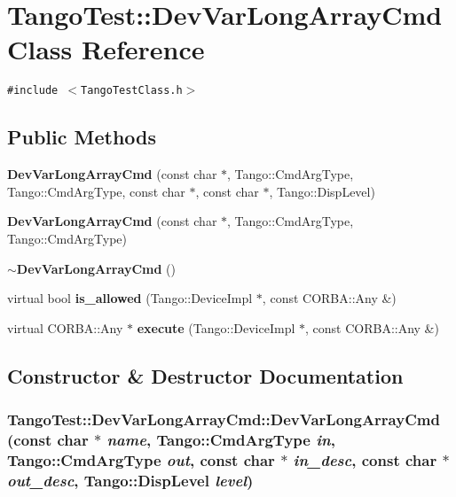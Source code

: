\section{Tango\-Test::Dev\-Var\-Long\-Array\-Cmd  Class Reference}
\label{classTangoTest_1_1DevVarLongArrayCmd}
{\tt \#include $<$Tango\-Test\-Class.h$>$}

\subsection*{Public Methods}
\begin{CompactItemize}
\item 
{\bf Dev\-Var\-Long\-Array\-Cmd} (const char $\ast$, Tango::Cmd\-Arg\-Type, Tango::Cmd\-Arg\-Type, const char $\ast$, const char $\ast$, Tango::Disp\-Level)
\item 
{\bf Dev\-Var\-Long\-Array\-Cmd} (const char $\ast$, Tango::Cmd\-Arg\-Type, Tango::Cmd\-Arg\-Type)
\item 
{\bf $\sim$Dev\-Var\-Long\-Array\-Cmd} ()
\item 
virtual bool {\bf is\_\-allowed} (Tango::Device\-Impl $\ast$, const CORBA::Any \&)
\item 
virtual CORBA::Any $\ast$ {\bf execute} (Tango::Device\-Impl $\ast$, const CORBA::Any \&)
\end{CompactItemize}


\subsection{Constructor \& Destructor Documentation}
\subsubsection{\setlength{\rightskip}{0pt plus 5cm}Tango\-Test::Dev\-Var\-Long\-Array\-Cmd::Dev\-Var\-Long\-Array\-Cmd (const char $\ast$ {\em name}, Tango::Cmd\-Arg\-Type {\em in}, Tango::Cmd\-Arg\-Type {\em out}, const char $\ast$ {\em in\_\-desc}, const char $\ast$ {\em out\_\-desc}, Tango::Disp\-Level {\em level})}\label{classTangoTest_1_1DevVarLongArrayCmd_a0}


